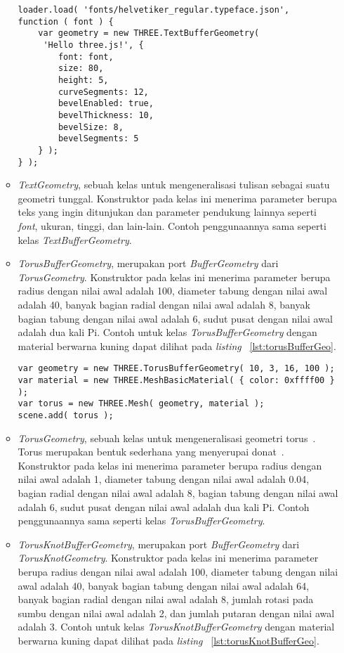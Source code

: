 \begin{itemize}
\begin{itemize}
\begin{lstlisting}[caption={Contoh penggunaan kelas {\it TextBufferGeometry}.}, label={lst:tetrahedronGeo},captionpos=b]
loader.load( 'fonts/helvetiker_regular.typeface.json',
function ( font ) {
	var geometry = new THREE.TextBufferGeometry(
	 'Hello three.js!', {
		font: font,
		size: 80,
		height: 5,
		curveSegments: 12,
		bevelEnabled: true,
		bevelThickness: 10,
		bevelSize: 8,
		bevelSegments: 5
	} );
} );
\end{lstlisting}
		\item {\it TextGeometry},  sebuah kelas untuk mengeneralisasi tulisan sebagai suatu geometri tunggal. Konstruktor pada kelas ini menerima parameter berupa teks yang ingin ditunjukan dan parameter pendukung lainnya seperti {\it font}, ukuran, tinggi, dan lain-lain. Contoh penggunaannya sama seperti kelas {\it TextBufferGeometry}.
		\item {\it TorusBufferGeometry}, merupakan port {\it BufferGeometry} dari {\it TorusGeometry}. Konstruktor pada kelas ini menerima parameter berupa radius dengan nilai awal adalah 100, diameter tabung dengan nilai awal adalah 40, banyak bagian radial dengan nilai awal adalah 8, banyak bagian tabung dengan nilai awal adalah 6, sudut pusat dengan nilai awal adalah dua kali Pi.  Contoh untuk kelas {\it TorusBufferGeometry} dengan material berwarna kuning dapat dilihat pada {\it listing} ~\ref{lst:torusBufferGeo}.
\begin{lstlisting}[caption={Contoh penggunaan kelas {\it TorusBufferGeometry}.}, label={lst:torusBufferGeo},captionpos=b]
var geometry = new THREE.TorusBufferGeometry( 10, 3, 16, 100 );
var material = new THREE.MeshBasicMaterial( { color: 0xffff00 } );
var torus = new THREE.Mesh( geometry, material );
scene.add( torus );
\end{lstlisting}
		\item {\it TorusGeometry}, sebuah kelas untuk mengeneralisasi geometri torus~\cite{threejs}. Torus merupakan bentuk sederhana yang menyerupai donat~\cite{learningThreejs}. Konstruktor pada kelas ini menerima parameter berupa radius dengan nilai awal adalah 1, diameter tabung dengan nilai awal adalah 0.04, bagian radial dengan nilai awal adalah 8, bagian tabung dengan nilai awal adalah 6, sudut pusat dengan nilai awal adalah dua kali Pi.  Contoh penggunaannya sama seperti kelas {\it TorusBufferGeometry}.
		\item {\it TorusKnotBufferGeometry}, merupakan port {\it BufferGeometry} dari {\it TorusKnotGeometry}. Konstruktor pada kelas ini menerima parameter berupa radius dengan nilai awal adalah 100, diameter tabung dengan nilai awal adalah 40, banyak bagian tabung dengan nilai awal adalah 64, banyak bagian radial dengan nilai awal adalah 8, jumlah rotasi pada sumbu dengan nilai awal adalah 2, dan jumlah putaran dengan nilai awal adalah 3. Contoh untuk kelas {\it TorusKnotBufferGeometry} dengan material berwarna kuning dapat dilihat pada {\it listing} ~\ref{lst:torusKnotBufferGeo}.

\end{itemize}
\end{itemize}
